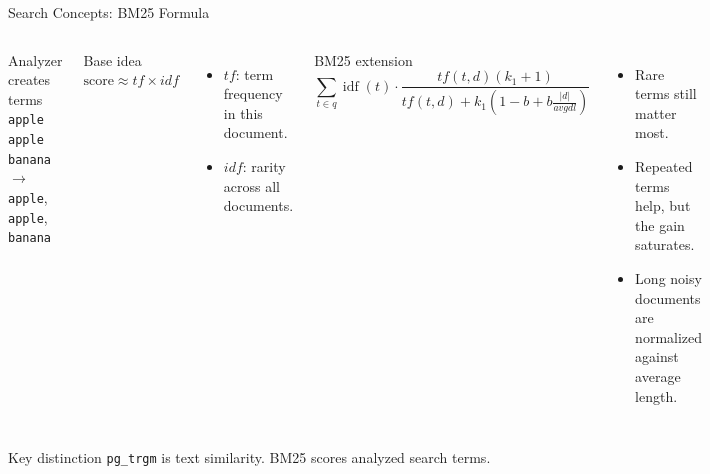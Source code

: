 \documentclass[aspectratio=169]{beamer}
\begin{document}
\begin{frame}{Search Concepts: BM25 Formula}
  \begin{columns}[T,totalwidth=\textwidth]
      \begin{block}{Analyzer creates terms}
        \texttt{apple apple banana}\\[0.2cm]
        $\rightarrow$ \texttt{apple}, \texttt{apple}, \texttt{banana}
      \end{block}

      \begin{block}{Base idea}
        \centering
        $\text{score} \approx tf \times idf$
      \end{block}

      \begin{itemize}
        \item $tf$: term frequency in this document.
        \item $idf$: rarity across all documents.
      \end{itemize}

      \begin{block}{BM25 extension}
        \scriptsize
        \[
          \sum_{t \in q} \operatorname{idf}(t) \cdot
          \frac{tf(t,d)(k_1 + 1)}
          {tf(t,d) + k_1\left(1 - b + b\frac{|d|}{avgdl}\right)}
        \]
      \end{block}

      \begin{itemize}
        \item Rare terms still matter most.
        \item Repeated terms help, but the gain saturates.
        \item Long noisy documents are normalized against average length.
      \end{itemize}
  \end{columns}

  \vspace{0.05cm}
  \begin{block}{Key distinction}
    \texttt{pg\_trgm} is text similarity. BM25 scores analyzed search terms.
  \end{block}
\end{frame}
\end{document}

